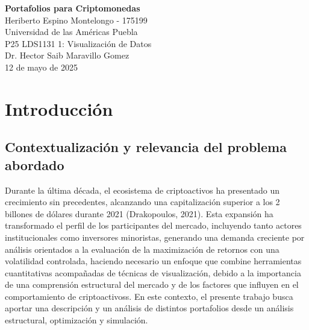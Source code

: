 \documentclass[12pt,letterpaper]{article}   %
\begin{document}
\begin{titlepage}
    \begin{center}
        \vspace*{2cm}
        \textbf{Portafolios para Criptomonedas}\\[2cm]

        Heriberto Espino Montelongo - 175199\\[0.5cm]
        Universidad de las Américas Puebla\\[0.5cm]
        P25 LDS1131 1: Visualización de Datos\\[0.5cm]
        Dr. Hector Saib Maravillo Gomez\\[0.5cm]
        12 de mayo de 2025\\
    \end{center}
    \vfill
\end{titlepage}




\setcounter{page}{1}
\tableofcontents
\newpage



\setcounter{page}{1}




\section{Introducción}
\subsection{Contextualización y relevancia del problema abordado}
Durante la última década, el ecosistema de criptoactivos ha presentado un crecimiento sin precedentes, alcanzando una capitalización superior a los 2 billones de dólares durante 2021 (Drakopoulos, 2021). Esta expansión ha transformado el perfil de los participantes del mercado,  incluyendo tanto actores institucionales como inversores minoristas, generando una demanda creciente por análisis orientados a la evaluación de la maximización de retornos con una volatilidad controlada, haciendo necesario un enfoque que combine herramientas cuantitativas acompañadas de técnicas de visualización, debido a la importancia de una comprensión estructural del mercado y de los factores que influyen en el comportamiento de  criptoactivoss. En este contexto, el presente trabajo busca aportar una descripción y un análisis de distintos portafolios desde un análisis estructural, optimización y simulación.
\end{document}
